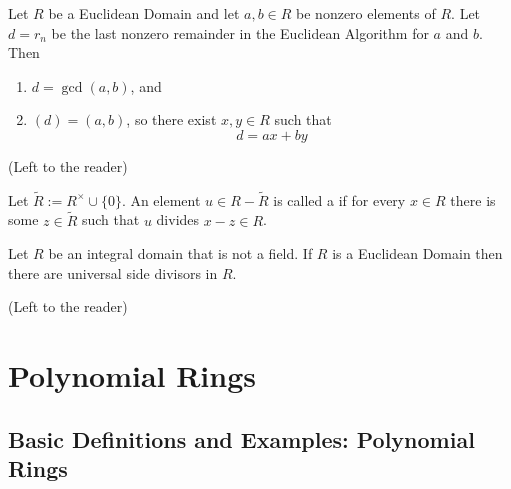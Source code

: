 \documentclass[12pt, a4paper, twoside, openright, titlepage]{book}
\begin{document}
\begin{thm}{}{}
    Let $R$ be a Euclidean Domain and let $a,b \in R$ be nonzero elements of $R$. Let $d = r_n$ be the last nonzero remainder in the Euclidean Algorithm for $a$ and $b$. Then \begin{enumerate}
        \item $d = \gcd(a,b)$, and 
        \item $(d) = (a,b)$, so there exist $x,y \in R$ such that \begin{equation}
                d = ax + by
        \end{equation}
    \end{enumerate}
\end{thm}
\begin{proof*}{}{}
    (Left to the reader)
\end{proof*}

\begin{defn}{}{}
    Let $\widetilde{R} := R^{\times}\cup \{0\}$. An element $u \in R - \widetilde{R}$ is called a  if for every $x \in R$ there is some $z \in \widetilde{R}$ such that $u$ divides $x-z \in R$.
\end{defn}


\begin{prop}{}{}
    Let $R$ be an integral domain that is not a field. If $R$ is a Euclidean Domain then there are universal side divisors in $R$.
\end{prop}
\begin{proof*}{}{}
    (Left to the reader)
\end{proof*}



\chapter{\textsection\textsection Polynomial Rings}

\section{\textsection Basic Definitions and Examples: Polynomial Rings}
\end{document}
